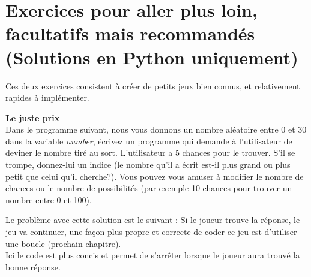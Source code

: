 \section{Exercices pour aller plus loin, facultatifs mais recommandés (Solutions en Python uniquement)} 
Ces deux exercices consistent à créer de petits jeux bien connus, et relativement rapides à implémenter. \\
\begin{Exercice}[20 minutes] \textbf{Le juste prix \optionnel}\\
  Dans le programme suivant, nous vous donnons un nombre aléatoire entre 0 et 30 dans la variable \textit{number}, écrivez un programme qui demande à l'utilisateur de deviner le nombre tiré au sort. L'utilisateur a 5 chances pour le trouver. S'il se trompe, donnez-lui un indice (le nombre qu'il a écrit est-il plus grand ou plus petit que celui qu'il cherche?). Vous pouvez vous amuser à modifier le nombre de chances ou le nombre de possibilités (par exemple 10 chances pour trouver un nombre entre 0 et 100).   \\
  
  
  
  

    \begin{solution}

   
   
   Le problème avec cette solution est le suivant : Si le joueur trouve la réponse, le jeu va continuer, une façon plus propre et correcte de coder ce jeu est d'utiliser une boucle (prochain chapitre). \\
   
   
   
  	Ici le code est plus concis et permet de s'arrêter lorsque le joueur aura trouvé la bonne réponse.\\
           
    \end{solution}   
\end{Exercice}


